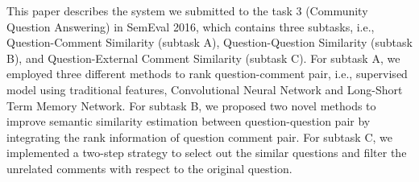 This paper describes the system we submitted to the task 3 (Community Question Answering) in SemEval 2016, which contains three subtasks, i.e., Question-Comment Similarity (subtask A), Question-Question Similarity (subtask B), and Question-External Comment Similarity (subtask C). For subtask A, we employed three different methods to rank question-comment pair, i.e., supervised model using traditional features, Convolutional Neural Network and Long-Short Term Memory Network. For subtask B, we proposed two novel methods to improve semantic similarity estimation between question-question pair by integrating the rank information of question comment pair. For subtask C, we implemented a two-step strategy to select out the similar questions and filter the unrelated comments with respect to the original question.
